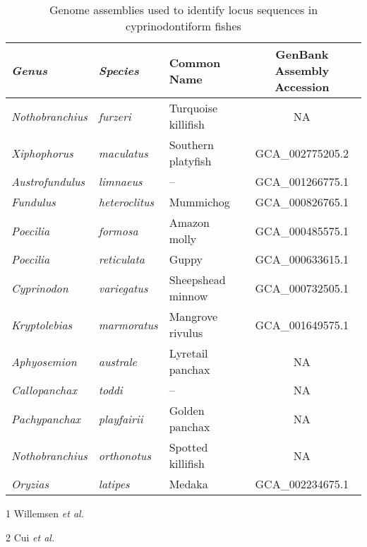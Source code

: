 \begin{table}[bh!]
\centering
\begin{threeparttable}
\begin{tabular}{>{\itshape}l>{\itshape}llc}\toprule
\textnormal{\textbf{Genus}} & \textnormal{\textbf{Species}} & \textbf{Common Name} & \textbf{GenBank Assembly Accession}\\\midrule
Nothobranchius & furzeri & Turquoise killifish & NA\tnote{1}\\\midrule
Xiphophorus & maculatus & Southern platyfish & GCA\_002775205.2\\
Austrofundulus & limnaeus & -- & GCA\_001266775.1\\
Fundulus & heteroclitus & Mummichog & GCA\_000826765.1\\
Poecilia & formosa & Amazon molly & GCA\_000485575.1\\
Poecilia & reticulata & Guppy & GCA\_000633615.1\\
Cyprinodon & variegatus & Sheepshead minnow & GCA\_000732505.1\\
Kryptolebias & marmoratus & Mangrove rivulus & GCA\_001649575.1\\\midrule
Aphyosemion & australe & Lyretail panchax & NA\tnote{2}\\
Callopanchax & toddi & -- & NA\tnote{2}\\
Pachypanchax & playfairii & Golden panchax & NA\tnote{2}\\
Nothobranchius & orthonotus & Spotted killifish & NA\tnote{2}\\\midrule
Oryzias & latipes & Medaka & GCA\_002234675.1\\
\bottomrule\end{tabular}
\begin{tablenotes}
\item[1] Willemsen \textit{et al.} \parencite{willemsen2019popgen}
\item[2] Cui \textit{et al.} \parencite{cui2019annual}
\end{tablenotes}
\end{threeparttable}
\vspace{0.5em}
\caption{Genome assemblies used to identify \igh{} locus sequences in cyprinodontiform fishes}
\label{tab:cyprinodontiform-genomes}
\end{table}

